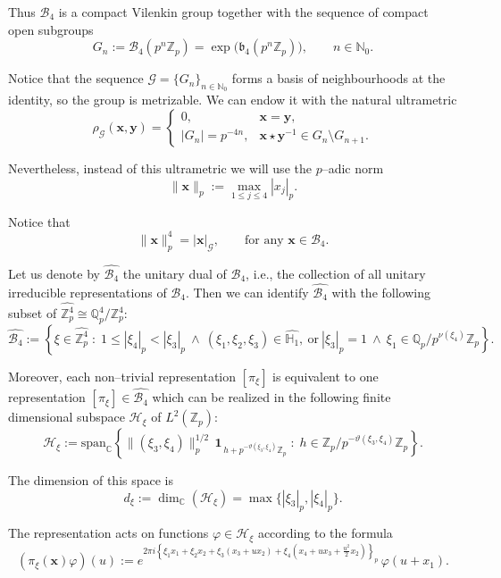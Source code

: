 \documentclass[12pt, reqno]{amsart}
\newcommand{\1}{\mathds{1}}
\begin{document}
Thus $\mathcal{B}_4$ is a compact Vilenkin group together with the sequence of
compact open subgroups
\[
G_n := \mathcal{B}_4(p^n\mathbb{Z}_p)
= \exp\!\bigl(\mathfrak{b}_4(p^n\mathbb{Z}_p)\bigr),
\qquad n\in\mathbb{N}_0 .
\]

Notice that the sequence $\mathcal{G}=\{G_n\}_{n\in\mathbb{N}_0}$ forms a basis
of neighbourhoods at the identity, so the group is metrizable. We can endow it
with the natural ultrametric
\[
\rho_{\mathcal{G}}(\mathbf{x},\mathbf{y})=
\begin{cases}
0, & \mathbf{x}=\mathbf{y},\\
|G_n|=p^{-4n}, & \mathbf{x}\star\mathbf{y}^{-1}\in G_n\setminus G_{n+1}.
\end{cases}
\]

Nevertheless, instead of this ultrametric we will use the $p$--adic norm
\[
\|\mathbf{x}\|_p
:=
\max_{1\le j\le4} |x_j |_p .
\]

Notice that
\[
\|\mathbf{x}\|_p^{4}=|\mathbf{x}|_{\mathcal{G}},
\qquad \text{for any } \mathbf{x}\in\mathcal{B}_4 .
\]

Let us denote by $\widehat{\mathcal{B}_4}$ the unitary dual of $\mathcal{B}_4$,
i.e., the collection of all unitary irreducible representations of $\mathcal{B}_4$.
Then we can identify $\widehat{\mathcal{B}_4}$ with the following subset of
$\widehat{\mathbb{Z}_p^4}\cong \mathbb{Q}_p^4/\mathbb{Z}_p^4$:
\[
\widehat{\mathcal{B}_4}
:=
\left\{
\xi \in \widehat{\mathbb{Z}_p^4}
\;:\;
1 \le |\xi_4|_p < |\xi_3|_p
\ \wedge\
(\xi_1,\xi_2,\xi_3)\in \widehat{\mathbb{H}_1},
\ \text{or}\ 
|\xi_3|_p = 1
\ \wedge\
\xi_1\in \mathbb{Q}_p/p^{\nu(\xi_4)}\mathbb{Z}_p
\right\}.
\]

Moreover, each non–trivial representation $[\pi_\xi]$ is equivalent to one
representation $[\pi_\xi]\in\widehat{\mathcal{B}_4}$ which can be realized in the
following finite dimensional subspace $\mathcal{H}_\xi$ of $L^2(\mathbb{Z}_p)$:
\[
\mathcal{H}_\xi
:=
\mathrm{span}_{\mathbb{C}}
\left\{
\|(\xi_3,\xi_4)\|_p^{1/2}
\,\mathbf{1}_{\,h+p^{-\vartheta(\xi_3,\xi_4)}\mathbb{Z}_p}
\;:\;
h\in \mathbb{Z}_p/p^{-\vartheta(\xi_3,\xi_4)}\mathbb{Z}_p
\right\}.
\]

The dimension of this space is
\[
d_\xi := \dim_{\mathbb{C}}(\mathcal{H}_\xi)
=
\max\{|\xi_3|_p,|\xi_4|_p\}.
\]

The representation acts on functions $\varphi\in\mathcal{H}_\xi$
according to the formula
\[
(\pi_\xi(\mathbf{x})\varphi)(u)
:=
e^{2\pi i
\left\{
\xi_1x_1
+\xi_2x_2
+\xi_3(x_3+ux_2)
+\xi_4\!\left(x_4+ux_3+\tfrac{u^2}{2}x_2\right)
\right\}_p}
\,
\varphi(u+x_1).
\]
\end{document}
